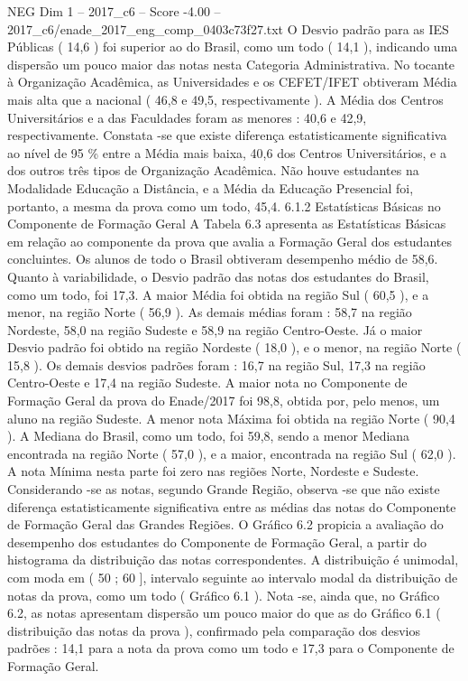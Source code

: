 \begin{textsample}{NEG Dim 1 – 2017\_c6 – Score -4.00 – 2017\_c6/enade\_2017\_eng\_comp\_0403c73f27.txt}
O Desvio padrão para as IES Públicas ( 14,6 ) foi superior ao do Brasil, como um todo ( 14,1 ), indicando uma dispersão um pouco maior das notas nesta Categoria Administrativa.
No tocante à Organização Acadêmica, as Universidades e os CEFET/IFET obtiveram Média mais alta que a nacional ( 46,8 e 49,5, respectivamente ).
A Média dos Centros Universitários e a das Faculdades foram as menores : 40,6 e 42,9, respectivamente.
Constata -se que existe diferença estatisticamente significativa ao nível de 95 \% entre a Média mais baixa, 40,6 dos Centros Universitários, e a dos outros três tipos de Organização Acadêmica.
Não houve estudantes na Modalidade Educação a Distância, e a Média da Educação Presencial foi, portanto, a mesma da prova como um todo, 45,4. 6.1.2 Estatísticas Básicas no Componente de Formação Geral A Tabela 6.3 apresenta as Estatísticas Básicas em relação ao componente da prova que avalia a Formação Geral dos estudantes concluintes.
Os alunos de todo o Brasil obtiveram desempenho médio de 58,6.
Quanto à variabilidade, o Desvio padrão das notas dos estudantes do Brasil, como um todo, foi 17,3.
A maior Média foi obtida na região Sul ( 60,5 ), e a menor, na região Norte ( 56,9 ).
As demais médias foram : 58,7 na região Nordeste, 58,0 na região Sudeste e 58,9 na região Centro-Oeste.
Já o maior Desvio padrão foi obtido na região Nordeste ( 18,0 ), e o menor, na região Norte ( 15,8 ).
Os demais desvios padrões foram : 16,7 na região Sul, 17,3 na região Centro-Oeste e 17,4 na região Sudeste.
A maior nota no Componente de Formação Geral da prova do Enade/2017 foi 98,8, obtida por, pelo menos, um aluno na região Sudeste.
A menor nota Máxima foi obtida na região Norte ( 90,4 ).
A Mediana do Brasil, como um todo, foi 59,8, sendo a menor Mediana encontrada na região Norte ( 57,0 ), e a maior, encontrada na região Sul ( 62,0 ).
A nota Mínima nesta parte foi zero nas regiões Norte, Nordeste e Sudeste.
Considerando -se as notas, segundo Grande Região, observa -se que não existe diferença estatisticamente significativa entre as médias das notas do Componente de Formação Geral das Grandes Regiões.
O Gráfico 6.2 propicia a avaliação do desempenho dos estudantes do Componente de Formação Geral, a partir do histograma da distribuição das notas correspondentes.
A distribuição é unimodal, com moda em ( 50 ; 60 ], intervalo seguinte ao intervalo modal da distribuição de notas da prova, como um todo ( Gráfico 6.1 ).
Nota -se, ainda que, no Gráfico 6.2, as notas apresentam dispersão um pouco maior do que as do Gráfico 6.1 ( distribuição das notas da prova ), confirmado pela comparação dos desvios padrões : 14,1 para a nota da prova como um todo e 17,3 para o Componente de Formação Geral.

\end{textsample}
